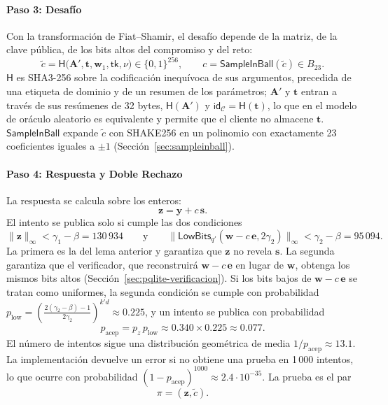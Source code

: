 \paragraph{Paso 3: Desafío}
Con la transformación de Fiat--Shamir, el desafío depende de la matriz, de la clave pública, de los bits altos del compromiso y del reto:
\begin{equation}
\tilde{c} = \mathsf{H}\big(\mathbf{A}', \mathbf{t}, \mathbf{w}_1, \mathsf{tk}, \nu\big) \in \{0,1\}^{256}, \qquad c = \mathsf{SampleInBall}(\tilde{c}) \in B_{23}.
\end{equation}
$\mathsf{H}$ es SHA3-256 sobre la codificación inequívoca de sus argumentos, precedida de una etiqueta de dominio y de un resumen de los parámetros; $\mathbf{A}'$ y $\mathbf{t}$ entran a través de sus resúmenes de 32 bytes, $\mathsf{H}(\mathbf{A}')$ y $\mathsf{id}_{\mathcal{C}} = \mathsf{H}(\mathbf{t})$, lo que en el modelo de oráculo aleatorio es equivalente y permite que el cliente no almacene $\mathbf{t}$. $\mathsf{SampleInBall}$ expande $\tilde{c}$ con SHAKE256 en un polinomio con exactamente 23 coeficientes iguales a $\pm 1$ (Sección~\ref{sec:sampleinball}).

\paragraph{Paso 4: Respuesta y Doble Rechazo}
La respuesta se calcula sobre los enteros:
\begin{equation}
\mathbf{z} = \mathbf{y} + c\,\mathbf{s}.
\end{equation}
El intento se publica solo si cumple las dos condiciones
\begin{equation}
\|\mathbf{z}\|_\infty < \gamma_1 - \beta = 130\,934
\qquad \text{y} \qquad
\big\|\mathsf{LowBits}_{q'}(\mathbf{w} - c\,\mathbf{e}, 2\gamma_2)\big\|_\infty < \gamma_2 - \beta = 95\,094 .
\label{eq:pqlite-rechazo}
\end{equation}
La primera es la del lema anterior y garantiza que $\mathbf{z}$ no revela $\mathbf{s}$. La segunda garantiza que el verificador, que reconstruirá $\mathbf{w} - c\,\mathbf{e}$ en lugar de $\mathbf{w}$, obtenga los mismos bits altos (Sección~\ref{sec:pqlite-verificacion}). Si los bits bajos de $\mathbf{w} - c\,\mathbf{e}$ se tratan como uniformes, la segunda condición se cumple con probabilidad $p_{\text{low}} = \left(\frac{2(\gamma_2-\beta)-1}{2\gamma_2}\right)^{k'd} \approx 0.225$, y un intento se publica con probabilidad
\begin{equation}
p_{\text{acep}} = p_z\, p_{\text{low}} \approx 0.340 \times 0.225 \approx 0.077 .
\end{equation}
El número de intentos sigue una distribución geométrica de media $1/p_{\text{acep}} \approx 13.1$. La implementación devuelve un error si no obtiene una prueba en 1\,000 intentos, lo que ocurre con probabilidad $(1 - p_{\text{acep}})^{1000} \approx 2.4 \cdot 10^{-35}$. La prueba es el par
\begin{equation}
\pi = (\mathbf{z}, \tilde{c}).
\end{equation}

